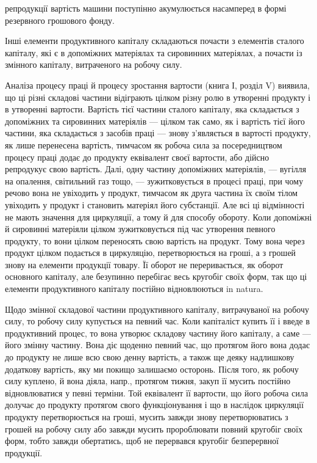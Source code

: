 \parcont{}  %
репродукції вартість машини поступінно акумулюється насамперед в формі резервного грошового фонду.

Інші елементи продуктивного капіталу складаються почасти з елементів сталого капіталу, які є в
допоміжних матеріялах та сировинних матеріялах, а почасти із змінного капіталу, витраченого на
робочу силу.

Аналіза процесу праці й процесу зростання вартости (книга І, розділ V) виявила, що ці різні складові
частини відіграють цілком різну ролю в утворенні продукту і в утворенні вартости. Вартість тієї
частини сталого капіталу, яка складається з допоміжних та сировинних матеріялів — цілком так само,
як і вартість тієї його частини, яка складається з засобів праці — знову з’являється в вартості
продукту, як лише перенесена вартість, тимчасом як робоча сила за посередництвом процесу праці додає
до продукту еквівалент своєї вартости, або дійсно репродукує свою вартість. Далі, одну частину
допоміжних матеріялів, — вугілля на опалення, світильний газ тощо, — зужитковується в процесі праці,
при чому речово вона не увіходить у продукт, тимчасом як друга частина їх своїм тілом увіходить у
продукт і становить матеріял його субстанції. Але всі ці відмінності не мають значення для
циркуляції, а тому й для способу обороту. Коли допоміжні й сировинні матеріяли цілком зужитковується
під час утворення певного продукту, то вони цілком переносять свою вартість на продукт. Тому вона
через продукт цілком подається в циркуляцію, перетворюється на гроші, а з грошей знову на елементи
продукції товару. Її оборот не переривається, як оборот основного капіталу, але безупинно перебігає
весь кругобіг своїх форм, так що ці елементи продуктивного капіталу постійно відновлюються in
natura.

Щодо змінної складової частини продуктивного капіталу, витрачуваної на робочу силу, то робочу силу
купується на певний час. Коли капіталіст купить її і введе в продуктивний процес, то вона утворює
складову частину його капіталу, а саме — його змінну частину. Вона діє щоденно певний час, що
протягом його вона додає до продукту не лише всю свою денну вартість, а також ще деяку надлишкову
додаткову вартість, яку ми покищо залишаємо осторонь. Після того, як робочу силу куплено, й вона
діяла, напр., протягом тижня, закуп її мусить постійно відновлюватися у певні терміни. Той
еквівалент її вартости, що його робоча сила долучає до продукту протягом свого функціонування і що в
наслідок циркуляції продукту перетворюється на гроші, мусить завжди знову перетворюватись з грошей
на робочу силу або завжди мусить пророблювати повний кругобіг своїх форм, тобто завжди обертатись,
щоб не перервався кругобіг безперервної продукції.

